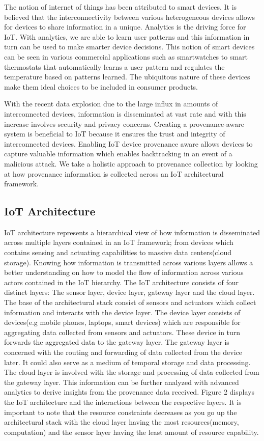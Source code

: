 The notion of internet of things has been attributed to smart devices. It is believed that the interconnectivity between various heterogeneous devices allows for devices to share information in a unique. Analytics is the driving force for IoT. With analytics, we are able to learn user patterns  and this information in turn can be used to make smarter device decisions. This notion of smart devices can be seen in various commercial applications such as smartwatches to smart thermostats that automatically learns a user pattern and regulates the temperature based on patterns learned. The ubiquitous nature of these devices make them ideal choices to be included in consumer products. 

\par With the recent data explosion due to the large influx in amounts of interconnected devices, information is disseminated at vast rate and with this increase involves security and privacy concerns. Creating a provenance-aware system is beneficial to IoT because it ensures the trust and  integrity of interconnected devices. Enabling IoT device provenance aware allows devices to capture valuable information which enables backtracking in an event of a malicious attack. We take a holistic approach to provenance collection by looking at how provenance information is collected across an IoT architectural framework.

 
  \subsection{IoT Architecture}

IoT architecture represents a hierarchical view of how information is disseminated across multiple layers contained in an IoT framework; from devices which contains sensing and actuating capabilities to massive data centers(cloud storage). Knowing how information is transmitted across various layers allows a better understanding on how to model the flow of information across various actors contained in the IoT hierarchy. The IoT architecture consists of four distinct layers: The sensor layer, device layer, gateway layer and the cloud layer. The base of the architectural stack consist of sensors and actuators which collect information and interacts with the device layer. The device layer consists of devices(e.g mobile phones, laptops, smart devices) which are responsible for aggregating data collected from sensors and actuators. These device in turn forwards the aggregated data to the gateway layer. The gateway layer is concerned with the routing and forwarding of data collected from the device later. It could also serve as a medium of temporal storage and data processing. The cloud layer is involved with the storage and processing of data collected from the gateway layer. This information can be further analyzed with advanced analytics to derive insights from the provenance data received.  Figure 2 displays the IoT architecture and the interactions between the respective  layers. It is important to note that the resource constraints decreases as you go up the architectural stack with the cloud layer having the most resources(memory, computation) and the sensor layer having the least amount of resource capability.


